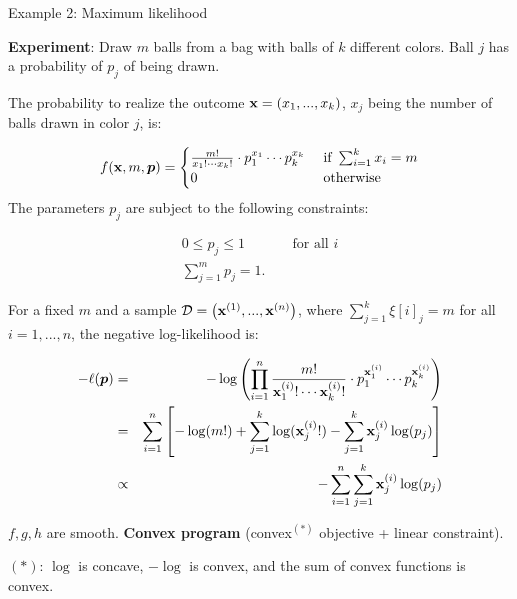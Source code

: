 \documentclass[11pt,compress,t,notes=noshow, xcolor=table]{beamer}
\begin{document}
\begin{vbframe}{Example 2: Maximum likelihood}

\textbf{Experiment}: Draw $m$ balls from a bag with balls of $k$ different colors. Ball $j$ has a probability of $p_j$ of being drawn. 

\lz 

The probability to realize the outcome $\xv = (x_1, ..., x_k)$, $x_j$ being the number of balls drawn in color $j$, is: 

$$
	f(\xv, m, \bm{p}) = \begin{cases} \frac{m!}{x_1! \cdots x_k!} \cdot p_1^{x_1} \cdots p_k^{x_k} & \text{ if } \sum_{i = 1}^k x_i = m \\ 0 & \text{ otherwise}\end{cases}
$$
The parameters $p_j$ are subject to the following constraints: 

\begin{eqnarray*}
	0 \le p_j \le 1 && \text{ for all } i \\
	 \sum_{j = 1}^m p_j = 1. &&
\end{eqnarray*}

\framebreak 

For a fixed $m$ and a sample $\D = \left(\xi[1], ..., \xi[n]\right)$, where $\sum_{j = 1}^k \xi[i]_j = m$ for all $i = 1, ..., n$, the negative log-likelihood is: 


\begin{eqnarray*}
	- \ell(\bm{p}) &=& - \log \left(\prod_{i = 1}^n  \frac{m!}{\xi_1! \cdots \xi_k!} \cdot p_1^{\xi_1} \cdots p_k^{\xi_k}    \right) \\
	&=& \sumin \left[- \log(m!) + \sum_{j = 1}^k \log(\xi_j!) - \sum_{j = 1}^k \xi_j \log(p_j)\right] \\
	&\propto& - \sumin \sum_{j = 1}^k \xi_j \log(p_j) 
\end{eqnarray*}

$f, g, h$ are smooth. \textbf{Convex program} (convex$^{(*)}$ objective + linear constraint). 

\vfill
\begin{footnotesize}
${(*)}$: $\log$ is concave, $- \log $ is convex, and the sum of convex functions is convex. 
\end{footnotesize}

\end{vbframe}




	
\end{document}
